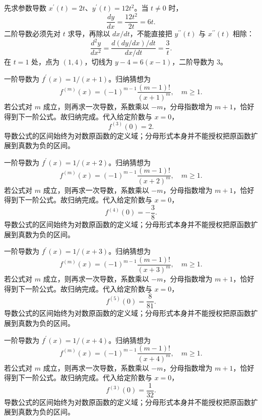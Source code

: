 \documentclass[UTF8,12pt,a4paper,fontset=fandol]{ctexart}
\begin{document}
\begin{solve}\label{ans:c9q12}
先求参数导数 $x^{\prime}(t)=2t$、$y^{\prime}(t)=12t^2$。当 $t\ne0$ 时，
\[
\frac{dy}{dx}=\frac{12t^2}{2t}=6t.
\]
二阶导数必须先对 $t$ 求导，再除以 $dx/dt$，不能直接把 $y^{\prime\prime}(t)$ 与 $x^{\prime\prime}(t)$ 相除：
\[
\frac{d^2y}{dx^2}=\frac{d(dy/dx)/dt}{dx/dt}=\frac{3}t.
\]
在 $t=1$ 处，点为 $(1,4)$，切线为 $y-4=6(x-1)$，二阶导数为 $3$。
\end{solve}

\begin{solve}\label{ans:c9q13}
一阶导数为 $f^{\prime}(x)=1/(x+1)$。归纳猜想为
\[
f^{(m)}(x)=(-1)^{m-1}\frac{(m-1)!}{(x+1)^m},\quad m\ge1.
\]
若公式对 $m$ 成立，则再求一次导数，系数乘以 $-m$，分母指数增为 $m+1$，恰好得到下一阶公式。故归纳完成。代入给定阶数与 $x=0$，
\[
f^{(3)}(0)=2.
\]
导数公式的区间始终为对数原函数的定义域；分母形式本身并不能授权把原函数扩展到真数为负的区间。
\end{solve}

\begin{solve}\label{ans:c9q14}
一阶导数为 $f^{\prime}(x)=1/(x+2)$。归纳猜想为
\[
f^{(m)}(x)=(-1)^{m-1}\frac{(m-1)!}{(x+2)^m},\quad m\ge1.
\]
若公式对 $m$ 成立，则再求一次导数，系数乘以 $-m$，分母指数增为 $m+1$，恰好得到下一阶公式。故归纳完成。代入给定阶数与 $x=0$，
\[
f^{(4)}(0)=-\frac{3}{8}.
\]
导数公式的区间始终为对数原函数的定义域；分母形式本身并不能授权把原函数扩展到真数为负的区间。
\end{solve}

\begin{solve}\label{ans:c9q15}
一阶导数为 $f^{\prime}(x)=1/(x+3)$。归纳猜想为
\[
f^{(m)}(x)=(-1)^{m-1}\frac{(m-1)!}{(x+3)^m},\quad m\ge1.
\]
若公式对 $m$ 成立，则再求一次导数，系数乘以 $-m$，分母指数增为 $m+1$，恰好得到下一阶公式。故归纳完成。代入给定阶数与 $x=0$，
\[
f^{(5)}(0)=\frac{8}{81}.
\]
导数公式的区间始终为对数原函数的定义域；分母形式本身并不能授权把原函数扩展到真数为负的区间。
\end{solve}

\begin{solve}\label{ans:c9q16}
一阶导数为 $f^{\prime}(x)=1/(x+4)$。归纳猜想为
\[
f^{(m)}(x)=(-1)^{m-1}\frac{(m-1)!}{(x+4)^m},\quad m\ge1.
\]
若公式对 $m$ 成立，则再求一次导数，系数乘以 $-m$，分母指数增为 $m+1$，恰好得到下一阶公式。故归纳完成。代入给定阶数与 $x=0$，
\[
f^{(3)}(0)=\frac{1}{32}.
\]
导数公式的区间始终为对数原函数的定义域；分母形式本身并不能授权把原函数扩展到真数为负的区间。
\end{solve}
\end{document}
